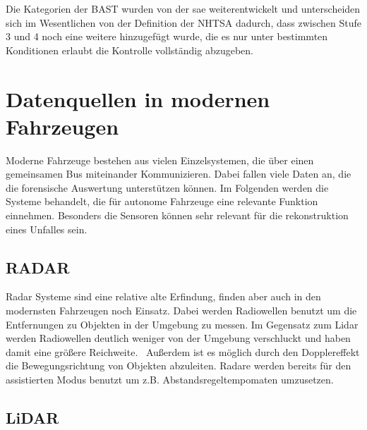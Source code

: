 \documentclass[conference,compsoc,final,a4paper]{IEEEtran}
\begin{document}
Die Kategorien der \ac{BAST} wurden von der \ac{sae} weiterentwickelt\cite{bast2021} und unterscheiden sich im Wesentlichen von der Definition der \ac{NHTSA} dadurch, dass zwischen Stufe 3 und 4 noch eine weitere hinzugefügt wurde, die es nur unter bestimmten Konditionen erlaubt die Kontrolle vollständig abzugeben\cite{SAE2021}.

\section{Datenquellen in modernen Fahrzeugen}

Moderne Fahrzeuge bestehen aus vielen Einzelsystemen, die über einen gemeinsamen Bus miteinander Kommunizieren.
Dabei fallen viele Daten an, die die forensische Auswertung unterstützen können. Im Folgenden werden die Systeme behandelt,
die für autonome Fahrzeuge eine relevante Funktion einnehmen.
Besonders die Sensoren können sehr relevant für die rekonstruktion eines Unfalles sein.

\subsection{RADAR}

Radar Systeme sind eine relative alte Erfindung, finden aber auch in den modernsten Fahrzeugen noch Einsatz.
Dabei werden Radiowellen benutzt um die Entfernungen zu Objekten in der Umgebung zu messen.
Im Gegensatz zum Lidar werden Radiowellen deutlich weniger von der Umgebung verschluckt und haben damit eine
größere Reichweite.~\cite{Neal2018} Außerdem ist es möglich durch den Dopplereffekt die Bewegungsrichtung von Objekten abzuleiten.
Radare werden bereits für den assistierten Modus benutzt um z.B. Abstandsregeltempomaten umzusetzen.

\subsection{LiDAR}
\end{document}
